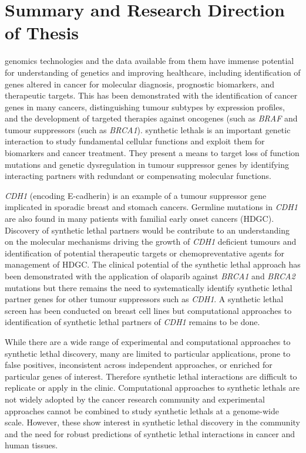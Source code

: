 \section{Summary and Research Direction of Thesis}

\Gls{genomics} technologies and the data available from them have immense potential for understanding of genetics and improving healthcare, including identification of genes altered in cancer for molecular diagnosis, prognostic biomarkers, and therapeutic targets. This has been demonstrated with the identification of cancer genes in many cancers, distinguishing tumour subtypes by expression profiles, and the development of targeted therapies against oncogenes (such as \textit{BRAF} and tumour suppressors (such as \textit{BRCA1}). \Glspl{synthetic lethal} is an important genetic interaction to study fundamental cellular functions and exploit them for biomarkers and cancer treatment. They present a means to target loss of function mutations and genetic dysregulation in tumour suppressor genes by identifying interacting partners with redundant or compensating molecular functions.  

\textit{CDH1} (encoding \gls{E-cadherin}) is an example of a tumour suppressor gene implicated in sporadic breast and stomach cancers. Germline mutations in \textit{CDH1} are also found in many patients with familial early onset cancers (\gls{HDGC}). Discovery of \gls{synthetic lethal} partners would be contribute to an understanding on the molecular mechanisms driving the growth of \textit{CDH1} deficient tumours and identification of potential therapeutic targets or chemopreventative agents for management of \gls{HDGC}. The clinical potential of the \gls{synthetic lethal} approach has been demonstrated with the application of olaparib against \textit{BRCA1} and \textit{BRCA2} mutations \citet{Lord2014} but there remains the need to systematically identify \gls{synthetic lethal} partner genes for other tumour suppressors such as \textit{CDH1}. A \gls{synthetic lethal} screen has been conducted on breast cell lines \citet{Telford2015} but computational approaches to identification of \gls{synthetic lethal} partners of \textit{CDH1} remains to be done.  


While there are a wide range of experimental and computational approaches to \gls{synthetic lethal} discovery, many are limited to particular applications, prone to false positives, inconsistent across independent approaches, or enriched for particular genes of interest. Therefore \gls{synthetic lethal} interactions are difficult to replicate or apply in the clinic. Computational approaches to \glspl{synthetic lethal} are not widely adopted by the cancer research community and experimental approaches cannot be combined to study \glspl{synthetic lethal} at a genome-wide scale. However, these show interest in \gls{synthetic lethal} discovery in the community and the need for robust predictions of \gls{synthetic lethal} interactions in cancer and human tissues.

